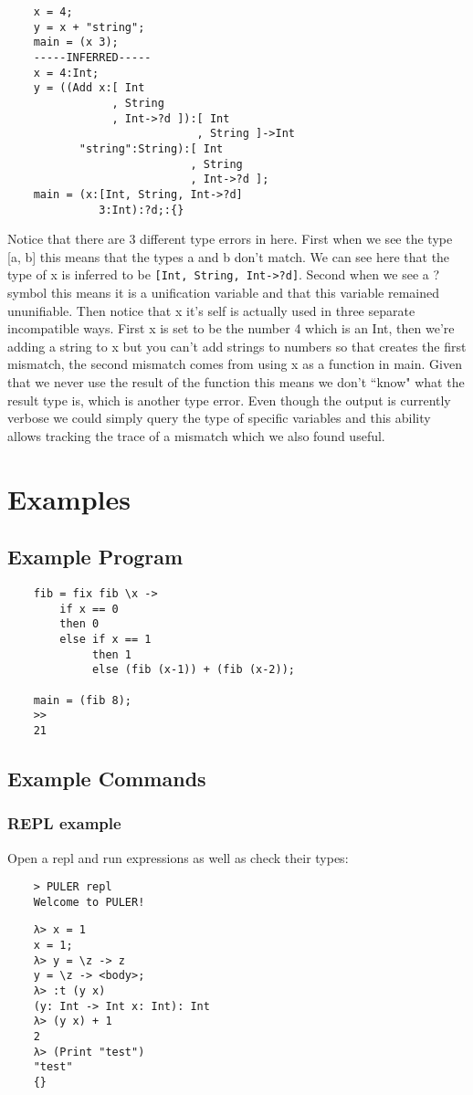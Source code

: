 \documentclass{article} %
\begin{document}
    \begin{verbatim}
    x = 4;
    y = x + "string";
    main = (x 3);
    -----INFERRED-----
    x = 4:Int;
    y = ((Add x:[ Int
                , String
                , Int->?d ]):[ Int
                             , String ]->Int
           "string":String):[ Int
                            , String
                            , Int->?d ];
    main = (x:[Int, String, Int->?d]
              3:Int):?d;:{}
    \end{verbatim}
    Notice that there are 3 different type errors in here. First when we see the type [a, b] this means that the types a and b don't match. We can see here that the type of x is inferred to be \texttt{[Int, String, Int->?d]}. Second when we see a ? symbol this means it is a unification variable and that this variable remained ununifiable. Then notice that x it's self is actually used in three separate incompatible ways. First x is set to be the number 4 which is an Int, then we're adding a string to x but you can't add strings to numbers so that creates the first mismatch, the second mismatch comes from using x as a function in main. Given that we never use the result of the function this means we don't ``know" what the result type is, which is another type error. Even though the output is currently verbose we could simply query the type of specific variables and this ability allows tracking the trace of a mismatch which we also found useful.
    




\section{Examples}
\subsection{Example Program}
\begin{verbatim}
    fib = fix fib \x ->
        if x == 0
        then 0
        else if x == 1
             then 1
             else (fib (x-1)) + (fib (x-2));
    
    main = (fib 8);
    >>
    21
\end{verbatim}

\subsection{Example Commands}
\subsubsection{REPL example}
Open a repl and run expressions as well as check their types:
\begin{verbatim}
    > PULER repl
    Welcome to PULER!
\end{verbatim}
\begin{verbatim}
    λ> x = 1
    x = 1;
    λ> y = \z -> z
    y = \z -> <body>;
    λ> :t (y x)
    (y: Int -> Int x: Int): Int
    λ> (y x) + 1
    2
    λ> (Print "test")
    "test"
    {}
\end{verbatim}
\end{document}
